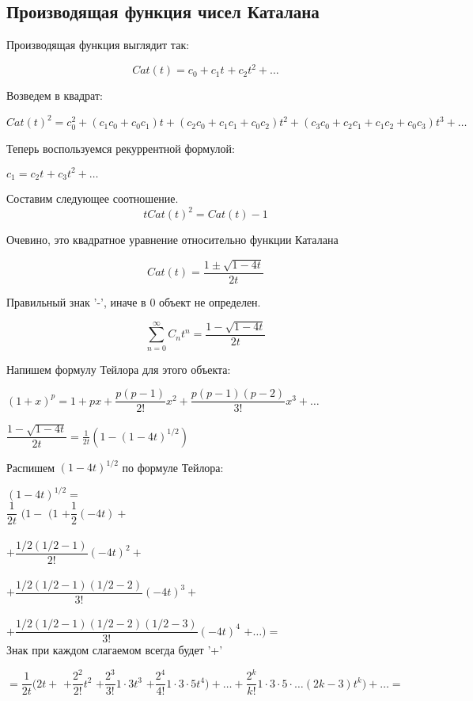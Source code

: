\subsection{Производящая функция чисел Каталана}

Производящая функция выглядит так:

$$
Cat(t) = c_{0} + c_{1} t^{} + c_{2} t^{2} + \ldots 
$$

Возведем в квадрат:

$Cat(t)^{2} = c_0^2 + (c_1 c_0 + c_0 c_1)t +(c_2 c_0 + c_1 c_1 + c_0 c_2)t^2
+ (c_3 c_0 + c_2 c_1 + c_1 c_2 + c_0 c_3)  t^3 + \ldots $

Теперь воспользуемся рекуррентной формулой:

$ c_{1}= c_{2} t^{} + c_{3} t^{2} + \ldots $

Составим следующее соотношение.
$$
t Cat(t)^2 = Cat(t)-1
$$

Очевино, это квадратное уравнение относительно функции Каталана

$$
Cat(t) = \dfrac{1 \pm \sqrt{1 - 4 t}}{2 t}
$$

Правильный знак '-', иначе в 0 объект не определен. 

$$
\sum_{n=0}^{\infty} C_n t^n = \frac{1-\sqrt{1-4 t}}{2 t}
$$

Напишем формулу Тейлора для этого объекта:

$(1+x)^p = 1 + px + \dfrac{p(p-1)}{2!} x^{2} + \dfrac{p(p-1)(p-2)}{3!} x^{3} + \ldots$

$\dfrac{1-\sqrt{1-4 t}}{2 t} = \frac{1}{2t} (1 - (1-4 t)^{1/2} )$

Распишем $ (1-4 t)^{1/2} $ по формуле Тейлора:

$(1-4 t)^{1/2} = $ \\
$\dfrac{1}{2t}$
$ ( 1 -  $
$(1 $
$ + \dfrac{1}{2}(-4t) + $ \\ \\
$ + \dfrac{1/2 (1/2 - 1)}{2!} (-4t)^{2} + $ \\ \\
$ + \dfrac{1/2 (1/2 - 1)(1/2 - 2)}{3!} (-4t)^{3} + $ \\ \\
$ + \dfrac{1/2 (1/2 - 1)(1/2 - 2)(1/2 - 3)}{3!} (-4t)^{4} $ 
$ + \ldots ) = $ \\

Знак при каждом слагаемом всегда будет '+'

$ = \dfrac{1}{2t}(2t + $
$ + \dfrac{2^{2}}{2!}t^{2}  $
$ + \dfrac{2^{3}}{3!} 1\cdot3 t^{3}  $
$ + \dfrac{2^{4}}{4!} 1 \cdot 3 \cdot 5 t^{4} ) + \ldots 
+ \dfrac{2^{k}}{k!} 1 \cdot 3 \cdot 5 \cdot \ldots (2k-3) t^{k} ) + \ldots = $

